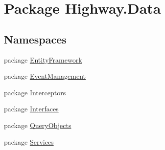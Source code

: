 \hypertarget{namespace_highway_1_1_data}{\section{Package Highway.\-Data}
\label{namespace_highway_1_1_data}
}
\subsection*{Namespaces}
\begin{DoxyCompactItemize}
\item 
package \hyperlink{namespace_highway_1_1_data_1_1_entity_framework}{Entity\-Framework}
\item 
package \hyperlink{namespace_highway_1_1_data_1_1_event_management}{Event\-Management}
\item 
package \hyperlink{namespace_highway_1_1_data_1_1_interceptors}{Interceptors}
\item 
package \hyperlink{namespace_highway_1_1_data_1_1_interfaces}{Interfaces}
\item 
package \hyperlink{namespace_highway_1_1_data_1_1_query_objects}{Query\-Objects}
\item 
package \hyperlink{namespace_highway_1_1_data_1_1_services}{Services}
\end{DoxyCompactItemize}
